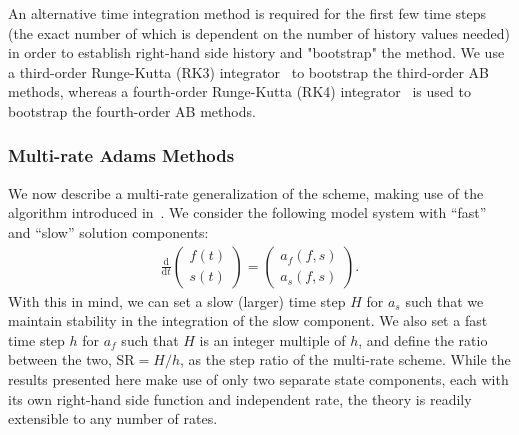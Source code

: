 An alternative time integration method is required for the first few time steps
(the exact number of which is dependent on the number of history values needed)
in order to establish right-hand side history and "bootstrap" the method.  We
use a third-order Runge-Kutta (RK3) integrator~\cite{heun1900neue} to bootstrap
the third-order AB methods, whereas a fourth-order Runge-Kutta (RK4)
integrator~\cite{kutta1901beitrag} is used to bootstrap the fourth-order AB
methods.

\subsubsection{Multi-rate Adams Methods}

We now describe a multi-rate generalization of the scheme, making use of the
algorithm introduced in~\cite{gear1984multirate}.  We consider the following
model system with ``fast'' and ``slow'' solution components:
\begin{align}
\frac{\textrm{d}}{\textrm{d}t}\left( \begin{array}{c} f(t) \\ s(t) \end{array} \right) = \left( \begin{array}{c} a_{f}(f,s) \\ a_{s}(f,s) \end{array} \right). \label{eq:mrab}
\end{align}
With this in mind, we can set a slow (larger) time step $H$ for $a_{s}$ such
that we maintain stability in the integration of the slow component.  We also
set a fast time step $h$ for $a_{f}$ such that $H$ is an integer multiple of
$h$, and define the ratio between the two, $\text{SR} = H/h$, as the step ratio
of the multi-rate scheme. While the results presented here make use of only two 
separate state components, each with its own right-hand side function and
independent rate, the theory is readily extensible to any number of rates.

